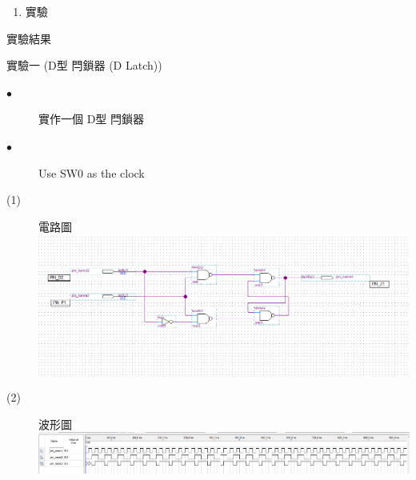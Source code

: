 \documentclass[12pt, a4paper]{article}
\begin{document}
\begin{description}
\begin{enumerate}
\begin{description}
                  \item[(3)] 閂鎖器與正反器相異處：\\
                  閂鎖器：不需時脈信號觸發即可做狀態的改變\\
                  正反器：需配合時脈信號觸發才可做狀態改變\\
                  
                \normalsize  
              \end{description}
            
              \item 實驗 

        \normalsize
      \end{enumerate}
    \item [二、]實驗結果
      \begin{description}
        \fontsize{20pt}{22pt}\selectfont
        \item 實驗一 (D型 閂鎖器 (D Latch))
          \fontsize{16pt}{18pt}\selectfont
            \begin{description}
              \item [$\bullet$]實作一個 D型 閂鎖器
              \item [$\bullet$]Use SW0 as the clock\\
              \fontsize{18pt}{20pt}
                \item [(1)]電路圖 \\[.3cm]
                  \includegraphics[width=13cm]{./image/ex1.PNG}
                \item [(2)] 波形圖 \\[.3cm]
                  \includegraphics[width=13cm]{./image/EX1_1.PNG}  \\          
            \end{description}
          \normalsize
          

\end{description}
\end{description}
\end{document}
